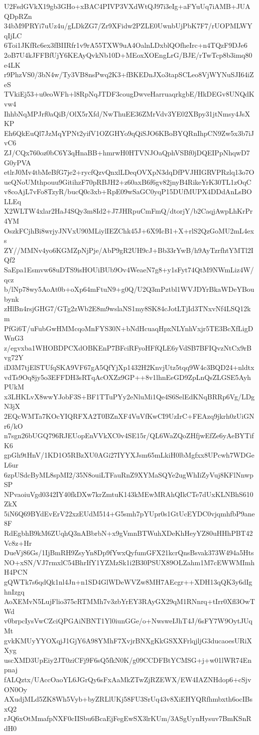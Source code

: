 U2FsdGVkX19gb3GHo+xBAC4PIVP3VXdWtQJ97i3eIg+aFYuUq7iAMB+JUAQDpRZn
34bM9PRYi7uUz4u/gLDkZG7/Zr9XFidw2PZLE0UwnbUjPbK7F7/rUOPMLWYqIjLC
6Toi1JKfRc6ex3fBIIRfr1v9rA55TXW9uA4OalnLDxblQOfheIrc+n4TQzF9DJe6
2oB7U4kJFFBfUjY6KEAyQvkNb10D+MEoxXOEngLrG/BJE/rTwTcp8b3imq80e4LK
r9PhzVS0/3bN4w/Ty3VB8nsPwq2K3+fBKEDnJXo3tapSCLeo8VjWYNuSJI64iZeS
TVkiEj53+u0eoWFh+l8RpNqJTDF3cougDwveHarruaqrkgbE/HkDEGv8UNQdKvw4
IhhbNqMPJrf0aQiB/OlX5rXfd/NwThuEE36ZMrVdv3YE02XBpy31jtNmsy4JsXKP
Eh6QkEuQl7JzMqYPNt2yifV1OZGHYo9qQiSJO6KBoBYQRnIhpCN9Zw5x3b7iJvC6
ZJ/CQx760oz0bC6Y3qHnaBB+hmrwH0HTVNJOaQphVSBf0jDQEIPpNhqwD7G0yPVA
etlrJ0Mv4tbMeBfG7je2+rycfQzvQnxlLDeqOVXpN3dqDfPVJHIGRVPRzlq13o7O
ueQNoUMthpouu9GitihzF70pRBJH2+z60axB6f6gv82jnyB4RikeYrK30TL1zOqC
v8coAjL7vFo8TzyR/bucQ0c3xb+RpE09wSaGC0yqP15DUfMUPX4DDdAnLsBOLLEq
X2WLTW4xlar2HaJ4SQy3m8Id2+J7JHRpuCmFmQ/dtorjY/b2CaqjAwpLhKrPr4YM
OszkFCjhBi8wrjyJNVxU90MLiylIEZChk45J+6X9IcB1+X+rlS2QzGoMU2mL4exs
ZY//MMNv4yo6KGMZpNjPje/AbP9gR2UH9cJ+Bb33rYwB/h9AyTzrfhtYMTl2IQf2
SaEpa1Esmvw68uDTS9isHOUiBUb9Ov4WeaeN7g8+y1sFyt74QtM9NWmLiz4W/qcz
b/lNp78wy5AoAt0b+oXp64mFtuN9+g0Q/U2Q3mPztbl1WVJDYrBkaWDeYBoubynk
zHlBn4rsjGHG7/GTg2zWb2E8m9wslaNS1my8SK84cJotLTjId3TNxvNf4LSQ12km
PfGi6T/uFubGwHMMcqoMnFYS30N+bNdHcuaqHpxNLYnhVxjr5TE3BcXfLigDWnG3
z/egvxba1WHOBDPCXdOBKEnP7BFciRFyoHFfQLE6yVdSB7BFIQvzNtCx9rBvg72Y
iD3M7tjElSTUfqSKA9VF67gA5QfYjXp1432H2KnvjUtz5tqq9W4c3BQD24+nldtx
vdTs9Oq8jy5o3EFFDH3sRTqAcOXZz9GP++8v1lhnEeGD9ZpLnQsZLGSE5AyhPUkM
x3LHKLvX8wwYJobF3S+BF1TTuPYy2eNluMi1Qe4S6SelEdKNqBRRp6Vg/LDgN3jX
2EQcWMTa7KOcYIQRFXA2T0BZnXF4VuVfKwCI9UzIrC+FEAzq9jkrh0zUiGNr6/kO
n7sgn26bUGQ796RJEUopEnVVkXC0v4SE15r/QL6WaZQoZHfjwEfZe6yAeBYTifK6
gpGh9tHnV/1KD1O5RBzXU0AGi27IYYXJsm65mLkiH0lbMgfxx8UPcwh7WDGeL6ur
6zpUSdcByML8spMI2/35N8ouiLTFauRnZ9XYMaSQYe2ugWhIiZyVuj8KFlNnwpSP
NPvaoiuVgd0342IY40fkDXw7krZmtuK143kMEwMRAhQIkCTe7dUxKLNBhS610ZkX
5iN6Q69BYdEvErV22xzEUdM514+G5smh7pYUpr0s1GtUcEYDC0vjqmhfbP9ane8F
RdEgbhB9kM6ZUqhQ3nABbrbN+x9gVmnBTWuhXDeKhHeyYZ80uHHhPBT42Vc8z+Hr
DueVj86Gs/1IjBmRH9ZsyYn8Dp9fYwxQyfumGFX21kcrQnsBsvak373W494a5Hts
NO+xSN/VJ7rmxlC54BhrIfY1YZMzSk1i2B30PSUX89OLZahm1M7cEWWMImhH4PCN
gQWTk7s6qdQk1nl4Jn+n1SD4GlWDeWVZw8MH7AEcgr++XDH13qQK3y6dIghnIzgq
AoXEMvN5LujFlio375cRTMMh7v3zbYrEY3RAyGX29qM1RNnrq+tIrr0Xfl3OwTWd
v0brpcIysVwCZciQPGAiNBNT1Yl0iunGGe/o+NwsweIJhT4J/6sFY7W9OytJUqMt
gvkKMUyYYOXqjJ1GjY6A98YMhF7XvjrBNXgKkGSXXFrlqjljG3ducaoesURiXXyg
uscXMD3UpEiy2JT0ziCFj9F6sQ5fkN0K/g09CCDFBtYCMSG+j+w01lWR74Enpnaj
fALQztx/UAccOaoYL6JGrQy6sFxAaMkZTwZjRZEWX/EW4IAZNHdop6+cSjvON0Oy
AXudjMLd5ZK8Wh5Vyb+byZRLlUKj58FU3SrUq43v8XiEHYQRfhmbxth6ocIBsxQ2
rJQ6xOtMmafpNXF0cIISbu6BcaEjFegEwSX3lrKUm/3ASgUynHysuv7BmKSnRdH0
